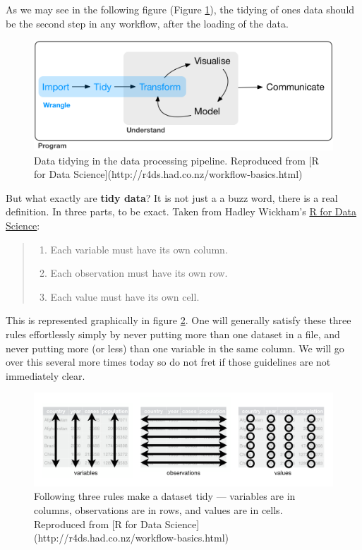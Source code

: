 \documentclass[]{book}
\providecommand{\tightlist}{%
  \setlength{\itemsep}{0pt}\setlength{\parskip}{0pt}}
\theoremstyle{definition}
\theoremstyle{definition}
\theoremstyle{definition}
\theoremstyle{remark}
\begin{document}
As we may see in the following figure (Figure \ref{fig:tidy}), the
tidying of ones data should be the second step in any workflow, after
the loading of the data.

\begin{figure}

{\centering \includegraphics[width=0.8\linewidth]{figures/data-science-wrangle} 

}

\caption{Data tidying in the data processing pipeline. Reproduced from [R for Data Science](http://r4ds.had.co.nz/workflow-basics.html)}\label{fig:tidy}
\end{figure}

But what exactly are \textbf{tidy data}? It is not just a a buzz word,
there is a real definition. In three parts, to be exact. Taken from
Hadley Wickham's \href{http://r4ds.had.co.nz/workflow-basics.html}{R for
Data Science}:

\begin{quote}
\begin{enumerate}
\def\labelenumi{\arabic{enumi}.}
\tightlist
\item
  Each variable must have its own column.\\
\item
  Each observation must have its own row.\\
\item
  Each value must have its own cell.
\end{enumerate}
\end{quote}

This is represented graphically in figure \ref{fig:tidy-structure}. One
will generally satisfy these three rules effortlessly simply by never
putting more than one dataset in a file, and never putting more (or
less) than one variable in the same column. We will go over this several
more times today so do not fret if those guidelines are not immediately
clear.

\begin{figure}

{\centering \includegraphics[width=0.8\linewidth]{figures/tidy-1} 

}

\caption{Following three rules make a dataset tidy --- variables are in columns, observations are in rows, and values are in cells. Reproduced from [R for Data Science](http://r4ds.had.co.nz/workflow-basics.html)}\label{fig:tidy-structure}
\end{figure}
\end{document}
